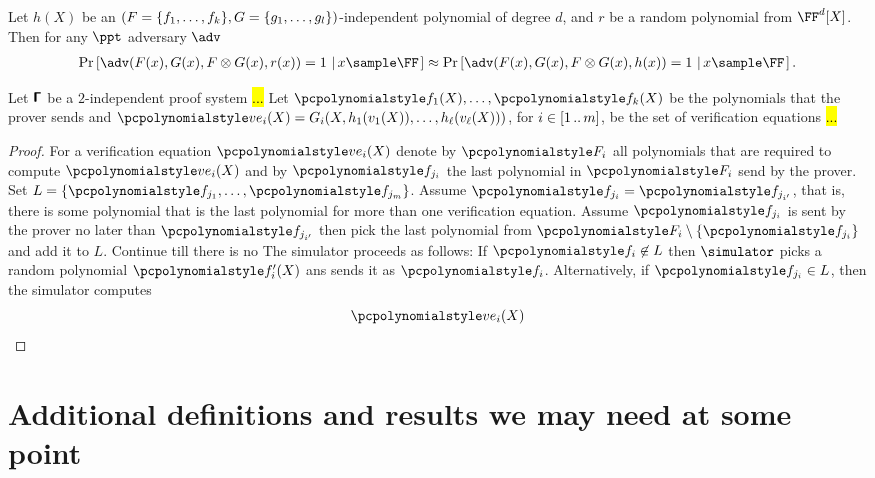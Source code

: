 \documentclass[runningheads,11pt]{llncs}
\begin{document}
\begin{definition}
  Let $h(X)$ be an
  $(F = \{f_1, \ldots, f_k\}, G = \{g_1, \ldots,
    g_l\})$-independent polynomial of degree $d$, and $r$ be a random polynomial
  from $\FF^d[X]$. Then for any $\ppt$ adversary $\adv$
  \begin{multline}
    \Pr\left[ \adv(F(x), G(x), F \otimes G (x), r(x)) = 1 \,\left|\, x \sample \FF
      \right.\right] \approx 
    \Pr\left[ \adv(F(x), G(x), F \otimes G (x), h(x)) = 1 \,\left|\, x \sample \FF
      \right.\right].
  \end{multline}
\end{definition}


\begin{lemma}
  Let $\bm{\mathsf{\Gamma}}$  be a $2$-independent proof system
  \hl{...}  Let $\pf_1(X), \ldots, \pf_k(X)$ be the polynomials that the prover
  sends and $\vereq_i(X) = G_i(X, h_1(v_1(X)), \ldots, h_\ell (v_\ell(X)))$, for
  $i \in [1 \, .. \, m]$, be the set of verification equations \hl{...}
\end{lemma}
\begin{proof}
  For a verification equation $\vereq_i(X)$ denote by $\p{F}_i$ all polynomials
  that are required to compute $\vereq_i(X)$ and by $\pf_{j_i}$ the last
  polynomial in $\p{F}_i$ send by the prover. Set
  $L = \smallset{\pf_{j_1}, \ldots, \pf_{j_m}}$. 
  Assume $\pf_{j_i} = \pf_{j_{i'}}$, that is, there is some polynomial that is
  the last polynomial for more than one verification equation. Assume
  $\pf_{j_i}$ is sent by the prover no later than $\pf_{j_{i'}}$ then pick the
  last polynomial from $\p{F}_{i} \setminus \smallset{\pf_{j_i}}$ and add it to
  $L$. Continue till there is no The simulator proceeds as follows: If
  $\pf_i \not\in L$ then $\simulator$ picks a random polynomial $\pf'_i(X)$ ans
  sends it as $\pf_i$. Alternatively, if $\pf_{j_i} \in L$, then the simulator
  computes
  \[
    \vereq_i(X) 
  \]
\end{proof}

\section{Additional definitions and results we may need at some point}
\end{document}
